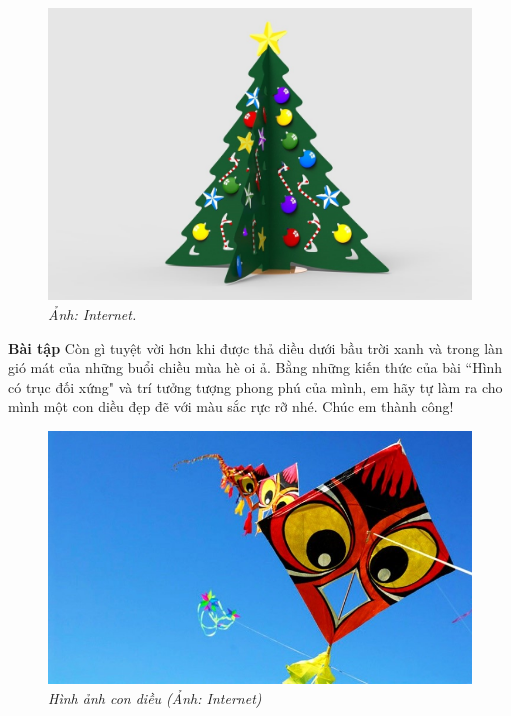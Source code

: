 \begin{multicols}{2}
\begin{figure}[H]
		\includegraphics[height= 0.31\linewidth]{9c}
		\caption{\small\textit{\color{toancuabi}Ảnh: Internet.}}
		\vspace*{-10pt}
	\end{figure}
	\textbf{\color{toancuabi}Bài tập}
	\vskip 0.1cm
	Còn gì tuyệt vời hơn khi được thả diều dưới bầu trời xanh và trong làn gió mát của những buổi chiều mùa hè oi ả. Bằng những kiến thức của bài ``Hình có trục đối xứng" và trí tưởng tượng phong phú của mình, em hãy tự làm ra cho mình một con diều đẹp đẽ với màu sắc rực rỡ nhé. Chúc em thành công!
	\begin{figure}[H]
			\vspace*{-5pt}
			\centering
			\captionsetup{labelformat= empty, justification=centering}
			\includegraphics[width= 1\linewidth]{10}
			\caption{\small\textit{\color{toancuabi}Hình ảnh con diều (Ảnh: Internet)}}
			\vspace*{-5pt}
		\end{figure}
\end{multicols}
